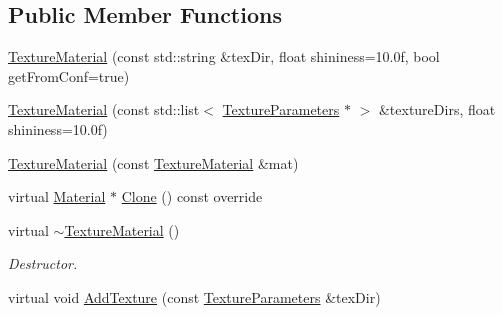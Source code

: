 \subsection*{Public Member Functions}
\begin{DoxyCompactItemize}
\item 
\mbox{\hyperlink{class_geometry_engine_1_1_geometry_material_1_1_texture_material_a3c928f93c8538111fba4e5985e9ce43e}{Texture\+Material}} (const std\+::string \&tex\+Dir, float shininess=10.\+0f, bool get\+From\+Conf=true)
\item 
\mbox{\hyperlink{class_geometry_engine_1_1_geometry_material_1_1_texture_material_af6c96a0f976b0ed3d558d7d395ec35b2}{Texture\+Material}} (const std\+::list$<$ \mbox{\hyperlink{class_geometry_engine_1_1_geometry_material_1_1_texture_parameters}{Texture\+Parameters}} $\ast$ $>$ \&texture\+Dirs, float shininess=10.\+0f)
\item 
\mbox{\hyperlink{class_geometry_engine_1_1_geometry_material_1_1_texture_material_a60678cd8338eeae2996e72b1d96a2364}{Texture\+Material}} (const \mbox{\hyperlink{class_geometry_engine_1_1_geometry_material_1_1_texture_material}{Texture\+Material}} \&mat)
\item 
virtual \mbox{\hyperlink{class_geometry_engine_1_1_geometry_material_1_1_material}{Material}} $\ast$ \mbox{\hyperlink{class_geometry_engine_1_1_geometry_material_1_1_texture_material_ace905cf02deb41ad8aa422ef2fb9070f}{Clone}} () const override
\item 
\mbox{\label{class_geometry_engine_1_1_geometry_material_1_1_texture_material_a9c7189b0ae8bd8c5325b527d31492bf7}} 
virtual \mbox{\hyperlink{class_geometry_engine_1_1_geometry_material_1_1_texture_material_a9c7189b0ae8bd8c5325b527d31492bf7}{$\sim$\+Texture\+Material}} ()
\begin{DoxyCompactList}\small\item\em Destructor. \end{DoxyCompactList}\item 
\mbox{\label{class_geometry_engine_1_1_geometry_material_1_1_texture_material_a8e8feb88aebfe46bbf5a9cb14222236e}} 
virtual void \mbox{\hyperlink{class_geometry_engine_1_1_geometry_material_1_1_texture_material_a8e8feb88aebfe46bbf5a9cb14222236e}{Add\+Texture}} (const \mbox{\hyperlink{class_geometry_engine_1_1_geometry_material_1_1_texture_parameters}{Texture\+Parameters}} \&tex\+Dir)

\end{DoxyCompactItemize}
